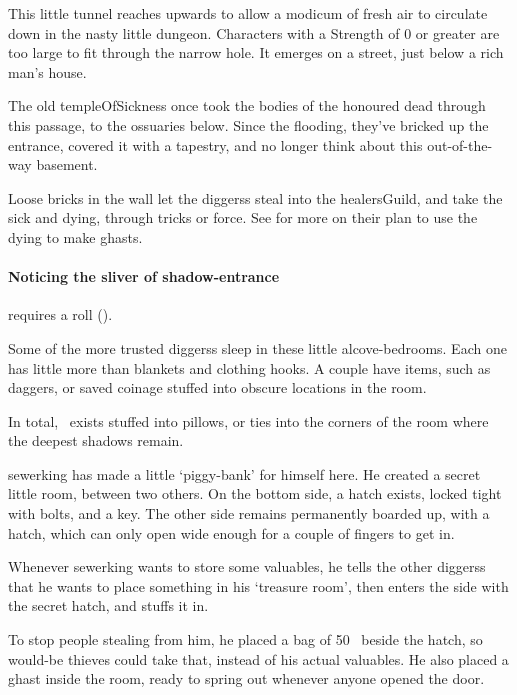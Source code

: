 \begin{multicols}{2}
This little tunnel reaches upwards to allow a modicum of fresh air to circulate down in the nasty little dungeon.
Characters with a Strength of 0 or greater are too large to fit through the narrow hole.
It emerges on a street, just below a rich man's house.


\begin{exampletext}
  The old \gls{templeOfSickness} once took the bodies of the honoured dead through this passage, to the ossuaries below.
  Since the flooding, they've bricked up the entrance, covered it with a tapestry, and no longer think about this out-of-the-way basement.

\end{exampletext}

Loose bricks in the wall let the \glspl{diggers} steal into the \gls{healersGuild}, and take the sick and dying, through tricks or force.
See  for more on their plan to use the dying to make ghasts.

\paragraph{Noticing the sliver of shadow-entrance}
requires a  roll (\tn[9]).


Some of the more trusted \glspl{diggers} sleep in these little alcove-bedrooms.
Each one has little more than blankets and clothing hooks.
A couple have items, such as daggers, or saved coinage stuffed into obscure locations in the room.

In total, \lootMedium\ exists stuffed into pillows, or ties into the corners of the room where the deepest shadows remain.


\Gls{sewerking} has made a little `piggy-bank' for himself here.
He created a secret little room, between two others.
On the bottom side, a hatch exists, locked tight with bolts, and a key.
The other side remains permanently boarded up, with a hatch, which can only open wide enough for a couple of fingers to get in.

Whenever \gls{sewerking} wants to store some valuables, he tells the other \glspl{diggers} that he wants to place something in his `treasure room', then enters the side with the secret hatch, and stuffs it in.

To stop people stealing from him, he placed a bag of 50~ beside the hatch, so would-be thieves could take that, instead of his actual valuables.
He also placed a ghast inside the room, ready to spring out whenever anyone opened the door.


\end{multicols}

